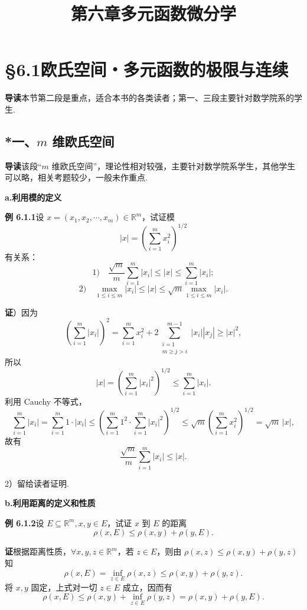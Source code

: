 \documentclass[UTF8,12pt,a4paper,fontset=fandol]{ctexart}
\title{第六章\quad 多元函数微分学}
\author{}
\date{}
\begin{document}
\maketitle

\section*{§6.1\quad 欧氏空间・多元函数的极限与连续}

\noindent\textbf{导读}\quad 本节第二段是重点，适合本书的各类读者；第一、三段主要针对数学院系的学生.

\subsection*{*一、$m$ 维欧氏空间}

\noindent\textbf{导读}\quad 该段“$m$ 维欧氏空间”，理论性相对较强，主要针对数学院系学生，其他学生可以略，相关考题较少，一般未作重点.

\noindent\textbf{a.\quad 利用模的定义}

\noindent\textbf{例 6.1.1}\quad 设 $x=(x_1,x_2,\cdots,x_m)\in\mathbb{R}^m$，试证模
\[
  |x|=\left(\sum_{i=1}^m x_i^2\right)^{1/2}
\]
有关系：
\[
  1)\quad \frac{\sqrt m}{m}\sum_{i=1}^m |x_i|\le |x|\le \sum_{i=1}^m |x_i|;
\]
\[
  2)\quad \max_{1\le i\le m}|x_i|\le |x|\le
  \sqrt m\max_{1\le i\le m}|x_i|.
\]

\noindent\textbf{证}）因为
\[
  \left(\sum_{i=1}^m |x_i|\right)^2
  =\sum_{i=1}^m x_i^2+
  2\sum_{\substack{i=1\\ m\ge j>i}}^{m-1}|x_i||x_j|
  \ge |x|^2,
\]
所以
\[
  |x|=\left(\sum_{i=1}^m |x_i|^2\right)^{1/2}
  \le \sum_{i=1}^m |x_i|.
\]
利用 Cauchy 不等式，
\[
  \sum_{i=1}^m |x_i|
  =\sum_{i=1}^m 1\cdot |x_i|
  \le \left(\sum_{i=1}^m 1^2\cdot\sum_{i=1}^m |x_i|^2\right)^{1/2}
  \le \sqrt m\left(\sum_{i=1}^m x_i^2\right)^{1/2}
  =\sqrt m\,|x|,
\]
故有
\[
  \frac{\sqrt m}{m}\sum_{i=1}^m |x_i|\le |x|.
\]

2）留给读者证明.

\noindent\textbf{b.\quad 利用距离的定义和性质}

\noindent\textbf{例 6.1.2}\quad 设 $E\subseteq\mathbb{R}^m,x,y\in E$，试证 $x$ 到 $E$ 的距离
\[
  \rho(x,E)\le \rho(x,y)+\rho(y,E).
\]

\noindent\textbf{证}\quad 根据距离性质，$\forall x,y,z\in\mathbb{R}^m$，若 $z\in E$，则由 $\rho(x,z)\le \rho(x,y)+\rho(y,z)$ 知
\[
  \rho(x,E)=\inf_{z\in E}\rho(x,z)\le \rho(x,y)+\rho(y,z).
\]
将 $x,y$ 固定，上式对一切 $z\in E$ 成立，因而有
\[
  \rho(x,E)\le \rho(x,y)+\inf_{z\in E}\rho(y,z)
  =\rho(x,y)+\rho(y,E).
\]
\end{document}
